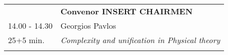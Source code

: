 \begin{longtable}{p{3cm}p{13cm}}
&\hfill {\bf Convenor INSERT CHAIRMEN }\\ 
14.00 - 14.30 & Georgios Pavlos\\ 
25+5 min. & {\it Complexity and unification in Physical theory}\\ 
 & \\ 
\end{longtable}

